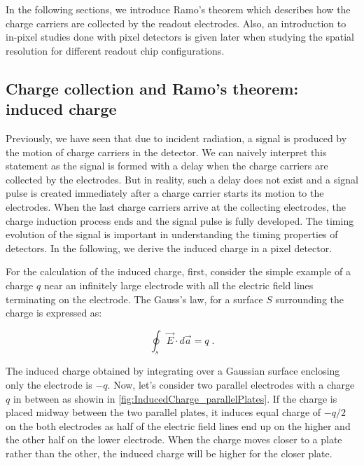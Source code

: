 In the following sections, we introduce Ramo's theorem which describes
how the charge carriers are collected by the readout electrodes. Also,
an introduction to in-pixel studies done with pixel detectors is given
later when studying the spatial resolution for different readout chip
configurations.


\subsection{Charge collection and Ramo's theorem: induced charge}
\label{sec:RamoTheorem}

Previously, we have seen that due to incident radiation, a signal is
produced by the motion of charge carriers in the detector. We can
naively interpret this statement as the signal is formed with a delay
when the charge carriers are collected by the electrodes. But in
reality, such a delay does not exist and a signal pulse is created
immediately after a charge carrier starts its motion to the
electrodes. When the last charge carriers arrive at the collecting
electrodes, the charge induction process ends and the signal pulse is
fully developed. The timing evolution of the signal is important in
understanding the timing properties of detectors. In the following, we
derive the induced charge in a pixel detector.

For the calculation of the induced charge, first, consider the simple
example of a charge $q$ near an infinitely large electrode with all
the electric field lines terminating on the electrode. The Gauss's
law, for a surface $S$ surrounding the charge is expressed as:

\begin{equation}
\oint_{s} \vec{E} \cdot d\vec{a}=q\; .
\label{eq:GaussLaw}
\end{equation}

The induced charge obtained by integrating over a Gaussian surface
enclosing only the electrode is $-q$. Now, let's consider two parallel
electrodes with a charge $q$ in between as showin in
\cref{fig:InducedCharge_parallelPlates}. If the charge is placed
midway between the two parallel plates, it induces equal charge of
$-q/2$ on the both electrodes as half of the electric field lines end
up on the higher and the other half on the lower electrode. When the
charge moves closer to a plate rather than the other, the induced
charge will be higher for the closer plate.

